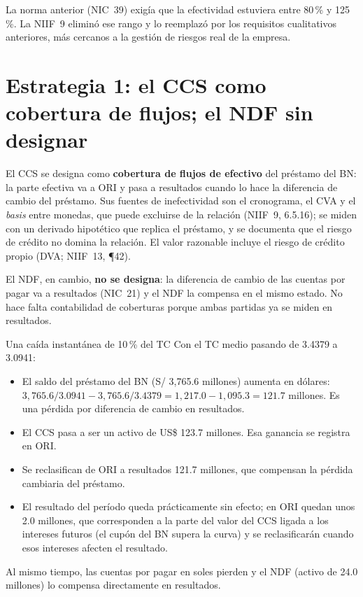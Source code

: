 \begin{adicional}
La norma anterior (NIC~39) exigía que la efectividad estuviera entre 80\,\% y 125\,\%. La NIIF~9 eliminó ese rango y lo reemplazó por los requisitos cualitativos anteriores, más cercanos a la gestión de riesgos real de la empresa.
\end{adicional}

\section{Estrategia 1: el CCS como cobertura de flujos; el NDF sin designar}

\begin{informe}
El CCS se designa como \textbf{cobertura de flujos de efectivo} del préstamo del BN: la parte efectiva va a ORI y pasa a resultados cuando lo hace la diferencia de cambio del préstamo. Sus fuentes de inefectividad son el cronograma, el CVA y el \emph{basis} entre monedas, que puede excluirse de la relación (NIIF~9, 6.5.16); se miden con un derivado hipotético que replica el préstamo, y se documenta que el riesgo de crédito no domina la relación. El valor razonable incluye el riesgo de crédito propio (DVA; NIIF~13, ¶42).

El NDF, en cambio, \textbf{no se designa}: la diferencia de cambio de las cuentas por pagar va a resultados (NIC~21) y el NDF la compensa en el mismo estado. No hace falta contabilidad de coberturas porque ambas partidas ya se miden en resultados.
\end{informe}

\begin{ejemplo}{Una caída instantánea de 10\,\% del TC}
Con el TC medio pasando de 3.4379 a 3.0941:
\begin{itemize}
\item El saldo del préstamo del BN (S/ 3,765.6 millones) aumenta en dólares: $3{,}765.6/3.0941-3{,}765.6/3.4379=1{,}217.0-1{,}095.3=121.7$ millones. Es una pérdida por diferencia de cambio en resultados.
\item El CCS pasa a ser un activo de US\$ 123.7 millones. Esa ganancia se registra en ORI.
\item Se reclasifican de ORI a resultados 121.7 millones, que compensan la pérdida cambiaria del préstamo.
\item El resultado del período queda prácticamente sin efecto; en ORI quedan unos 2.0 millones, que corresponden a la parte del valor del CCS ligada a los intereses futuros (el cupón del BN supera la curva) y se reclasificarán cuando esos intereses afecten el resultado.
\end{itemize}
Al mismo tiempo, las cuentas por pagar en soles pierden y el NDF (activo de 24.0 millones) lo compensa directamente en resultados.
\end{ejemplo}

